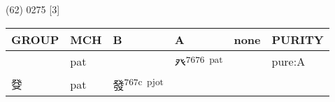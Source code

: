 \documentclass[14pt,a4paper]{scrartcl}
\begin{document}
(62) 0275 {[}3{]}

\begin{longtable}[c]{@{}llllll@{}}
\toprule
\begin{minipage}[b]{0.14\columnwidth}\raggedright\strut
GROUP
\strut\end{minipage} &
\begin{minipage}[b]{0.14\columnwidth}\raggedright\strut
MCH
\strut\end{minipage} &
\begin{minipage}[b]{0.14\columnwidth}\raggedright\strut
B
\strut\end{minipage} &
\begin{minipage}[b]{0.14\columnwidth}\raggedright\strut
A
\strut\end{minipage} &
\begin{minipage}[b]{0.14\columnwidth}\raggedright\strut
none
\strut\end{minipage} &
\begin{minipage}[b]{0.14\columnwidth}\raggedright\strut
PURITY
\strut\end{minipage}\tabularnewline
\midrule
\endhead
\begin{minipage}[t]{0.14\columnwidth}\raggedright\strut
𣥠
\strut\end{minipage} &
\begin{minipage}[t]{0.14\columnwidth}\raggedright\strut
pat
\strut\end{minipage} &
\begin{minipage}[t]{0.14\columnwidth}\raggedright\strut
\strut\end{minipage} &
\begin{minipage}[t]{0.14\columnwidth}\raggedright\strut
癶\textsuperscript{7676~pat}
\strut\end{minipage} &
\begin{minipage}[t]{0.14\columnwidth}\raggedright\strut
\strut\end{minipage} &
\begin{minipage}[t]{0.14\columnwidth}\raggedright\strut
pure:A
\strut\end{minipage}\tabularnewline
\begin{minipage}[t]{0.14\columnwidth}\raggedright\strut
癹
\strut\end{minipage} &
\begin{minipage}[t]{0.14\columnwidth}\raggedright\strut
pat
\strut\end{minipage} &
\begin{minipage}[t]{0.14\columnwidth}\raggedright\strut
發\textsuperscript{767c~pjot}

\end{minipage}
\end{longtable}
\end{document}

